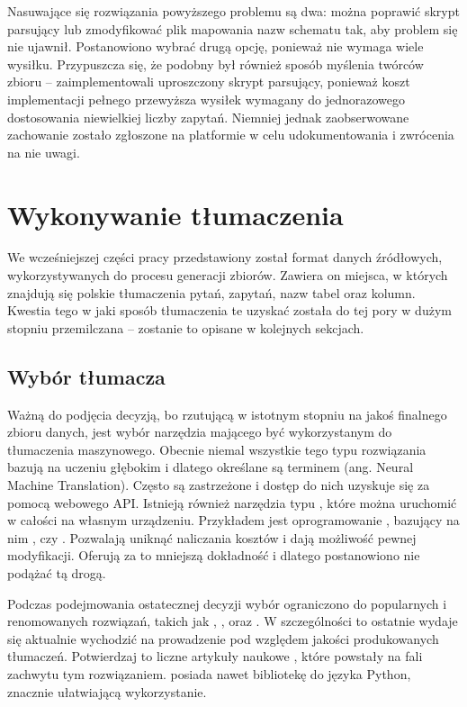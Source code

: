 Nasuwające się rozwiązania powyższego problemu są dwa: można poprawić skrypt parsujący lub zmodyfikować plik mapowania nazw schematu tak, aby problem się nie ujawnił. Postanowiono wybrać drugą opcję, ponieważ nie wymaga wiele wysiłku. Przypuszcza się, że podobny był również sposób myślenia twórców zbioru  -- zaimplementowali uproszczony skrypt parsujący, ponieważ koszt implementacji pełnego przewyższa wysiłek wymagany do jednorazowego dostosowania niewielkiej liczby zapytań. Niemniej jednak zaobserwowane zachowanie zostało zgłoszone na platformie  w celu udokumentowania i zwrócenia na nie uwagi.

\section{Wykonywanie tłumaczenia}
We wcześniejszej części pracy przedstawiony został format danych źródłowych, wykorzystywanych do procesu generacji zbiorów. Zawiera on miejsca, w których znajdują się polskie tłumaczenia pytań, zapytań, nazw tabel oraz kolumn. Kwestia tego w jaki sposób tłumaczenia te uzyskać została do tej pory w dużym stopniu przemilczana -- zostanie to opisane w kolejnych sekcjach.

\subsection{Wybór tłumacza}
Ważną do podjęcia decyzją, bo rzutującą w istotnym stopniu na jakoś finalnego zbioru danych, jest wybór narzędzia mającego być wykorzystanym do tłumaczenia maszynowego. Obecnie niemal wszystkie tego typu rozwiązania bazują na uczeniu głębokim i dlatego określane są terminem  (ang. Neural Machine Translation). Często są zastrzeżone i dostęp do nich uzyskuje się za pomocą webowego API. Istnieją również narzędzia typu , które można uruchomić w całości na własnym urządzeniu. Przykładem jest oprogramowanie  , bazujący na nim  , czy  . Pozwalają uniknąć naliczania kosztów i dają możliwość pewnej modyfikacji. Oferują za to mniejszą dokładność i dlatego postanowiono nie podążać tą drogą.

Podczas podejmowania ostatecznej decyzji wybór ograniczono do popularnych i renomowanych rozwiązań, takich jak  ,  ,   oraz  . W szczególności to ostatnie wydaje się aktualnie wychodzić na prowadzenie pod względem jakości produkowanych tłumaczeń. Potwierdzaj to liczne artykuły naukowe , które powstały na fali zachwytu tym rozwiązaniem.  posiada nawet bibliotekę do języka Python, znacznie ułatwiającą wykorzystanie. 

